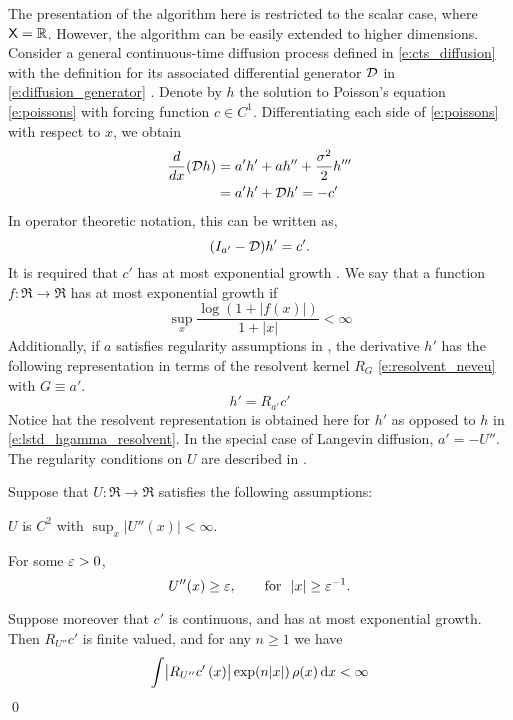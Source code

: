 The presentation of the algorithm here is restricted to the scalar case, where ${\sf X} = \mathbb{R}$. However, the algorithm can be easily extended to higher dimensions. 
Consider a general continuous-time diffusion process defined in \eqref{e:cts_diffusion} with the definition for its associated differential generator ${\cal D}$ in \eqref{e:diffusion_generator} . Denote by $h$ the solution to Poisson's equation \eqref{e:poissons} with forcing function $c \in C^1$.  Differentiating each side of \eqref{e:poissons} with respect to $x$, we obtain
\begin{equation}
\begin{aligned}
\frac{d}{dx} ({\cal D} h) & = a'h' + ah'' + \frac{\sigma^2}{2} h''' \\
&  = 	a'h' + {\cal D} h'  = -c'
\end{aligned}
\end{equation}
In operator theoretic notation, this can be written as,
\begin{equation}
(I_{a'} - {\cal D})h' = c'.
\end{equation}
It is required that $c'$ has at most exponential growth \cite{devkonmey17b}. We say that a function $f\colon\Re\to\Re$ has at most exponential growth if
\begin{equation}
\sup_x  \frac{ \log(1+|f(x)|)}{1+|x|}  <\infty
\end{equation}
Additionally, if $a$ satisfies regularity assumptions in , the derivative $h'$ has the following representation in terms of the resolvent kernel $R_G$ \eqref{e:resolvent_neveu} with $G \equiv a'$. 
\begin{equation}
h' = R_{a'} c'
\label{e:gradTD_h'_resolvent}
\end{equation}
Notice hat the resolvent representation is obtained here for $h'$ as opposed to $h$ in \eqref{e:lstd_hgamma_resolvent}. In the special case of Langevin diffusion, $a' = -U''$. The regularity conditions on $U$ are described in .
\begin{proposition}
	\label{prop:regularity_U}
	Suppose that $U\colon\Re\to\Re$ satisfies the following assumptions:
	\begin{romannum}
		\item $U$ is $C^2$ with $\sup_x |U''(x)| <\infty$.
		\item  For some $\varepsilon>0$,
		\begin{equation}
		U''(x) \ge \varepsilon,\qquad \text{for} \ \ |x|\ge \varepsilon^{-1}.
		\end{equation}
	\end{romannum}
	Suppose moreover that $c'$ is continuous, and has at most exponential growth.
	Then $ R_{U''} c'$ is finite valued, and for any $n\ge 1$ we have
	\begin{equation}
	\int   \bigl|  R_{U''} c'\, (x) \bigr|\exp(n |x|)  \, \rho(x) \,\textmd{d} x  <\infty
	\end{equation}
	\qed
\end{proposition}

